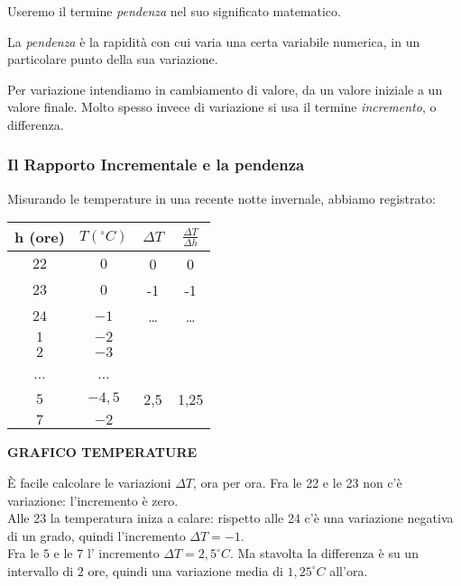 Useremo il termine \emph{pendenza} nel suo significato matematico.
\begin{definizione}
La \emph{pendenza} è la rapidità con cui varia una certa variabile
numerica, in un particolare punto della sua variazione. 
\end{definizione}

Per variazione intendiamo in cambiamento di valore, da un valore iniziale a un 
valore finale. Molto spesso invece di variazione si usa il termine 
\emph{incremento}, o differenza.

\subsubsection{Il Rapporto Incrementale e la pendenza}
\label{subsubsec:RI}
\begin{esempio}
Misurando le temperature in una recente notte invernale, abbiamo registrato:

 \begin{minipage}{0.48\textwidth}
 \begin{center}
\begin{tabular}{cccc}\toprule
h (ore) & \(T (^\circ C)\) & \(\Delta T\) 
             & \(\frac{\Delta T}{\Delta h}\)\\\midrule
\(22\) & \(0\) & 0 & 0 \\
\(23\) & \(0\) & -1 &-1\\
\(24\) & \(-1\) &\dots & \dots\\
\(1\)  & \(-2\)\\
\(2\)  & \(-3\) \\
...    & ... \\
\(5\)  &  \(-4,5\) & 2,5 & 1,25\\
\(7\)  &  \(-2\)\\ \bottomrule
\end{tabular}
\label{tab:diff_velocita}
\end{center}
\end{minipage}
 \hfill
\begin{minipage}{.48 \textwidth}
\textbf{GRAFICO TEMPERATURE}
    \label{graf:temperature}
\end{minipage}

È facile calcolare le variazioni \(\Delta T\), ora per ora. Fra le 22 e le 23 
non c'è variazione: l'incremento è zero. \\
Alle 23 la temperatura iniza a calare: rispetto alle 24 c'è una 
variazione negativa di un grado, quindi l'incremento \( \Delta T=-1\). \\
Fra le \(5\) e le \(7\) l' incremento \(\Delta T= 2,5 ^\circ C\). Ma stavolta 
la differenza è su un intervallo di \(2\) ore, quindi una variazione media di 
\(1,25 ^\circ C\) all'ora.


\end{esempio}
